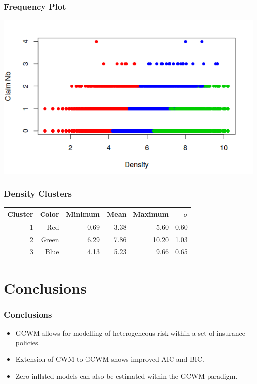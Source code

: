 \documentclass{beamer}
\begin{document}
\begin{frame}
\frametitle{Frequency Plot}
\begin{center}
\label{frequencyGraph}
\includegraphics[scale=0.80]{frequency.png}
\end{center}
\end{frame}


\begin{frame}
\frametitle{Density Clusters}
\begin{center}
\begin{tabular}{rrrrrr}
\hline
\hline
Cluster  & Color & Minimum & Mean & Maximum & $\sigma$  \\
\hline
1 &   Red         & 0.69    & 3.38 & 5.60    & 0.60  \\
2 &  Green       & 6.29    & 7.86 & 10.20   & 1.03  \\
3 &  Blue        & 4.13    & 5.23 & 9.66    & 0.65 \\
\hline\hline
\end{tabular}
\end{center}
\end{frame}



\section{Conclusions}

\begin{frame}
\frametitle{Conclusions}
\begin{itemize}
\item GCWM allows for modelling of heterogeneous risk within a set of insurance policies. 
\item Extension of CWM to GCWM shows improved  AIC and BIC. 
\item Zero-inflated models can also be estimated within the GCWM paradigm. 
\end{itemize}
\end{frame}
\end{document}
